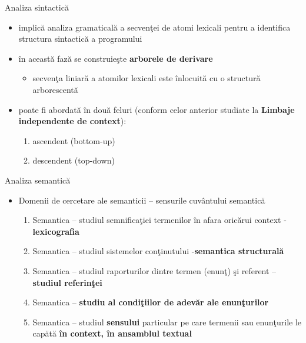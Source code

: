 \documentclass[pdf]{beamer}
\begin{document}
\begin{frame}{Analiza sintactică}
\begin{itemize}
\item
implică analiza gramaticală a secvenţei de atomi lexicali pentru a identifica structura sintactică a programului

\item
în această fază se construieşte \textbf{arborele de derivare}

\begin{itemize}
\item
secvenţa liniară a atomilor lexicali este înlocuită cu o structură arborescentă
\end{itemize}

\item
poate fi abordată în două feluri (conform celor anterior studiate la \textbf{Limbaje independente de context}):
\begin{enumerate}
  \item 
  ascendent (bottom-up)
  \item  
  descendent (top-down)
\end{enumerate}
\end{itemize}
\end{frame}



\begin{frame}{Analiza semantică}
\begin{itemize}
\item
Domenii de cercetare ale semanticii – sensurile cuvântului semantică
\begin{enumerate}
\item
Semantica – studiul semnificaţiei termenilor în afara oricărui context - \textbf{lexicografia}

\item
Semantica – studiul sistemelor conţinutului -\textbf{semantica structurală}

\item
Semantica – studiul raporturilor dintre termen (enunţ) şi referent – \textbf{studiul referinţei}

\item
Semantica – \textbf{studiu al condiţiilor de adevăr ale enunţurilor}

\item
Semantica – studiul \textbf{sensului} particular pe care termenii sau enunţurile le capătă \textbf{în context, în ansamblul textual}
\end{enumerate}
\end{itemize}
\end{frame}
\end{document}
